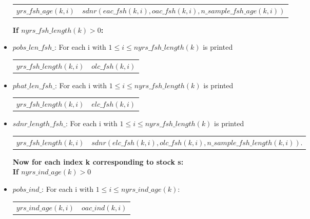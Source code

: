 \documentclass{article}
\begin{document}
\begin{itemize}
\begin{center}
    \begin{tabular}{c c}
        $yrs\_fsh\_age(k,i)$ &  $sdnr( eac\_fsh(k,i),oac\_fsh(k,i),n\_sample\_fsh\_age(k,i))$\\
          
    \end{tabular}
\end{center}
\textbf{If $nyrs\_fsh\_length(k)>0$:}
\item $pobs\_len\_fsh\_$: For each i with $1\leq i \leq nyrs\_fsh\_length(k)$ is printed
\begin{center}
    \begin{tabular}{c c}
       $yrs\_fsh\_length(k,i)$  &  $olc\_fsh(k,i)$\\
\end{tabular}
\end{center}

\item $phat\_len\_fsh\_$: For each i with $1\leq i \leq nyrs\_fsh\_length(k)$ is printed
\begin{center}
    \begin{tabular}{c c}
       $yrs\_fsh\_length(k,i)$  &  $elc\_fsh(k,i)$\\
\end{tabular}
\end{center}

\item $sdnr\_length\_fsh\_$: For each i with $1\leq i \leq nyrs\_fsh\_length(k)$ is printed
\begin{center}
    \begin{tabular}{c c}
       $yrs\_fsh\_length(k,i)$  &  $sdnr( elc\_fsh(k,i),olc\_fsh(k,i),n\_sample\_fsh\_length(k,i))$.\\
\end{tabular}
\end{center}

\textbf{Now for each index k corresponding to stock s:}\\
\textbf{If $nyrs\_ind\_age(k)>0$}

\item $pobs\_ind\_$: For each i with $1\leq i \leq nyrs\_ind\_age(k)$:
\begin{center}
    \begin{tabular}{c c}
        $yrs\_ind\_age(k,i)$ & $oac\_ind(k,i)$ \\ 
    \end{tabular}
\end{center}


\end{itemize}
\end{document}
